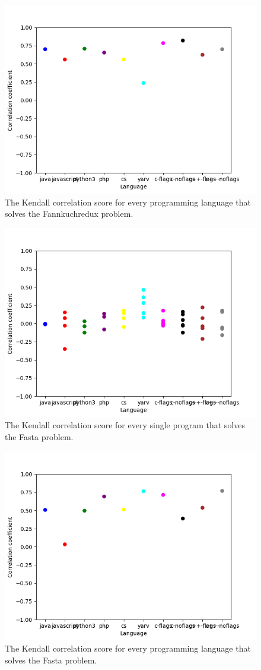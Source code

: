 \begin{appendices}
\begin{figure}[h]
    \centering
    \includegraphics[width=.6\textwidth]{graphs/kendall-lang_Fannkuchredux.png}
    \caption{The Kendall correlation score for every programming language that solves the Fannkuchredux problem.}
    \label{fig:corr-lang-fannkuchredux}
\end{figure}

\begin{figure}[h]
    \centering
    \includegraphics[width=.6\textwidth]{graphs/kendall_Fasta.png}
    \caption{The Kendall correlation score for every single program that solves the Fasta problem.}
    \label{fig:corr-fasta}
\end{figure}

\begin{figure}[h]
    \centering
    \includegraphics[width=.6\textwidth]{graphs/kendall-lang_Fasta.png}
    \caption{The Kendall correlation score for every programming language that solves the Fasta problem.}
    \label{fig:corr-lang-fasta}
\end{figure}


\end{appendices}
